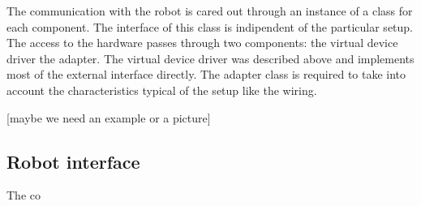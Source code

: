 The communication with the robot is cared out through an instance of a class for each component. The interface of this class is indipendent of the particular setup. The access to the hardware passes through two components: the virtual device driver the adapter. The virtual device driver was described above and implements most of the external interface directly. The adapter class is required to take into account the characteristics typical of the setup like the wiring.

[maybe we need an example or a picture]

\subsection{Robot interface}
The co
